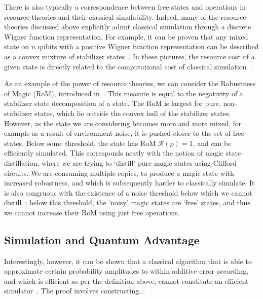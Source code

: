 There is also typically a correspondence between free states and operations in resource theories and their classical simulability. Indeed, many of the resource theories discussed above explicitly admit classical simulation through a discrete Wigner function representation. For example, it can be proven that any mixed state on $n$ qubits with a positive Wigner function representation can be described as a convex mixture of stabilizer states~\cite{Gross2006}. In these pictures, the resource cost of a given state is directly related to the computational cost of classical simulation~\cite{Howard2017,Kocia2017,Seddon2019,Raussendorf2019}.\par
As an example of the power of resource theories, we can consider the Robustness of Magic (RoM), introduced in~\cite{Howard2017}. This measure is equal to the negativity of a stabilizer state decomposition of a state. The RoM is largest for pure, non-stabilizer states, which lie outside the convex hull of the stabilizer states. However, as the state we are considering becomes more and more mixed, for example as a result of environment noise, it is pushed closer to the set of free states. Below some threshold, the state has RoM $\mathcal{R}\left(\rho\right)=1$, and can be efficiently simulated. This corresponds neatly with the notion of magic state distillation, where we are trying to `distill' pure magic states using Clifford circuits. We are consuming multiple copies, to produce a magic state with increased robustness, and which is subsequently harder to classically simulate. It is also congruous with the existence of a noise threshold below which we cannot distill~\cite{Bravyi2005}; below this threshold, the `noisy' magic states are `free' states, and thus we cannot increase their RoM using just free operations.
\subsection{Simulation and Quantum Advantage}\label{sec:intro_complexity}
Interestingly, however, it can be shown that a classical algorithm that is able to approximate certain probability amplitudes to within additive error according, and which is efficient as per the definition above, cannot constitute an efficient simulator~\cite{Pashayan2017}. The proof involves constructing... %



